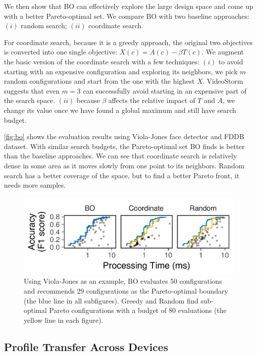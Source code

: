 We then show that BO can effectively explore the large design space and come up
with a better Pareto-optimal set. We compare BO with two baseline approaches:
$(i)$ random search; $(ii)$ coordinate search.

For coordinate search, because it is a greedy approach, the original two
objectives is converted into one single objective: $X(c) = A(c) - \beta
T(c)$. We augment the basic version of the coordinate search with a few
techniques: $(i)$ to avoid starting with an expensive configuration and
exploring its neighbors, we pick $m$ random configurations and start from the
one with the highest $X$. VideoStorm~\cite{zhang2017live} suggests that even
$m = 3$ can successfully avoid starting in an expensive part of the search
space. $(ii)$ because $\beta$ affects the relative impact of $T$ and $A$, we
change its value once we have found a global maximum and still have search
budget.

\autoref{fig:bo} shows the evaluation results using Viola-Jones face detector
and FDDB dataset. With similar search budgets, the Pareto-optimal set BO finds
is better than the baseline approaches. We can see that coordinate search is
relatively dense in some area as it moves slowly from one point to its
neighbors. Random search has a better coverage of the space, but to find a
better Pareto front, it needs more samples.

\begin{figure}
  \centering
  \includegraphics[width=0.85\columnwidth]{figures/bo-eval.pdf}
  \caption{Using Viola-Jones as an example, BO evaluates 50 configurations and
    recommends 29 configurations as the Pareto-optimal boundary (the blue line
    in all subfigures). Greedy and Random find sub-optimal Pareto configurations
    with a budget of 80 evaluations (the yellow line in each figure).}
  \label{fig:bo}
\end{figure}

\subsection{Profile Transfer Across Devices}
\label{sec:performance-transfer}

